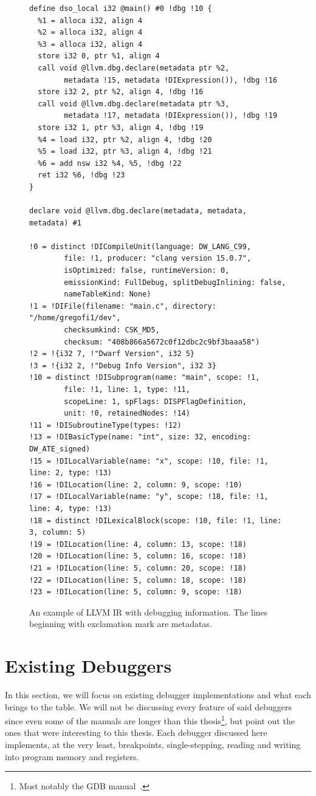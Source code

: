 \begin{figure}
    \begin{lstlisting}
define dso_local i32 @main() #0 !dbg !10 {
  %1 = alloca i32, align 4
  %2 = alloca i32, align 4
  %3 = alloca i32, align 4
  store i32 0, ptr %1, align 4
  call void @llvm.dbg.declare(metadata ptr %2,
        metadata !15, metadata !DIExpression()), !dbg !16
  store i32 2, ptr %2, align 4, !dbg !16
  call void @llvm.dbg.declare(metadata ptr %3,
        metadata !17, metadata !DIExpression()), !dbg !19
  store i32 1, ptr %3, align 4, !dbg !19
  %4 = load i32, ptr %2, align 4, !dbg !20
  %5 = load i32, ptr %3, align 4, !dbg !21
  %6 = add nsw i32 %4, %5, !dbg !22
  ret i32 %6, !dbg !23
}

declare void @llvm.dbg.declare(metadata, metadata, metadata) #1

!0 = distinct !DICompileUnit(language: DW_LANG_C99, 
        file: !1, producer: "clang version 15.0.7", 
        isOptimized: false, runtimeVersion: 0, 
        emissionKind: FullDebug, splitDebugInlining: false, 
        nameTableKind: None)
!1 = !DIFile(filename: "main.c", directory: "/home/gregofi1/dev",
        checksumkind: CSK_MD5,
        checksum: "408b866a5672c0f12dbc2c9bf3baaa58")
!2 = !{i32 7, !"Dwarf Version", i32 5}
!3 = !{i32 2, !"Debug Info Version", i32 3}
!10 = distinct !DISubprogram(name: "main", scope: !1,
        file: !1, line: 1, type: !11,
        scopeLine: 1, spFlags: DISPFlagDefinition,
        unit: !0, retainedNodes: !14)
!11 = !DISubroutineType(types: !12)
!13 = !DIBasicType(name: "int", size: 32, encoding: DW_ATE_signed)
!15 = !DILocalVariable(name: "x", scope: !10, file: !1, line: 2, type: !13)
!16 = !DILocation(line: 2, column: 9, scope: !10)
!17 = !DILocalVariable(name: "y", scope: !18, file: !1, line: 4, type: !13)
!18 = distinct !DILexicalBlock(scope: !10, file: !1, line: 3, column: 5)
!19 = !DILocation(line: 4, column: 13, scope: !18)
!20 = !DILocation(line: 5, column: 16, scope: !18)
!21 = !DILocation(line: 5, column: 20, scope: !18)
!22 = !DILocation(line: 5, column: 18, scope: !18)
!23 = !DILocation(line: 5, column: 9, scope: !18)
    \end{lstlisting}
    \caption{An example of LLVM IR with debugging information. The lines
    beginning with exclamation mark are metadatas.}
    \label{fig:llvm-ir-debug}
\end{figure}

\section{Existing Debuggers}
In this section, we will focus on existing debugger implementations and what
each brings to the table. We will not be discussing every feature of said
debuggers since even some of the manuals are longer than this
thesis\footnote{Most notably the GDB manual~\cite{gdb-manual}.}, but point out
the ones that were interesting to this thesis. Each debugger discussed here
implements, at the very least, breakpoints, single-stepping, reading and
writing into program memory and registers.

